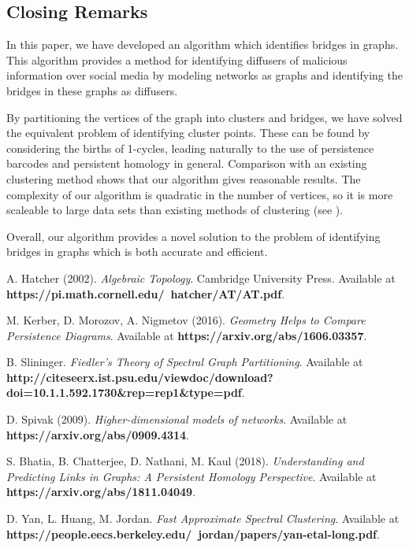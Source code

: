\documentclass[12pt,a4paper]{amsart}
\numberwithin{equation}{section}
\theoremstyle{plain}
\theoremstyle{definition}
\begin{document}
\subsection{Closing Remarks}

In this paper, we have developed an algorithm which identifies bridges in graphs. This algorithm provides a method for identifying diffusers of malicious information over social media by modeling networks as graphs and identifying the bridges in these graphs as diffusers.

By partitioning the vertices of the graph into clusters and bridges, we have solved the equivalent problem of identifying cluster points. These can be found by considering the births of 1-cycles, leading naturally to the use of persistence barcodes and persistent homology in general. Comparison with an existing clustering method shows that our algorithm gives reasonable results. The complexity of our algorithm is quadratic in the number of vertices, so it is more scaleable to large data sets than existing methods of clustering (see \cite{spectral}). 

Overall, our algorithm provides a novel solution to the problem of identifying bridges in graphs which is both accurate and efficient.




\newpage

\begin{thebibliography}{99}

 A. Hatcher (2002). \textit{Algebraic Topology}. Cambridge University Press. Available at \textbf{https://pi.math.cornell.edu/~hatcher/AT/AT.pdf}.

 M. Kerber, D. Morozov, A. Nigmetov (2016). \textit{Geometry Helps to Compare Persistence Diagrams}. Available at \textbf{https://arxiv.org/abs/1606.03357}.

 B. Slininger. \textit{Fiedler's Theory of Spectral Graph Partitioning}. Available at \textbf{http://citeseerx.ist.psu.edu/viewdoc/download?doi=10.1.1.592.1730\&rep=rep1\&type=pdf}.

 D. Spivak (2009). \textit{Higher-dimensional models of networks}. Available at \textbf{https://arxiv.org/abs/0909.4314}.

 S. Bhatia, B. Chatterjee, D. Nathani, M. Kaul (2018). \textit{Understanding and Predicting Links in Graphs: A Persistent Homology Perspective}. Available at \textbf{https://arxiv.org/abs/1811.04049}.

 D. Yan, L. Huang, M. Jordan. \textit{Fast Approximate Spectral Clustering}. Available at \textbf{https://people.eecs.berkeley.edu/~jordan/papers/yan-etal-long.pdf}.

\end{thebibliography}
\end{document}
